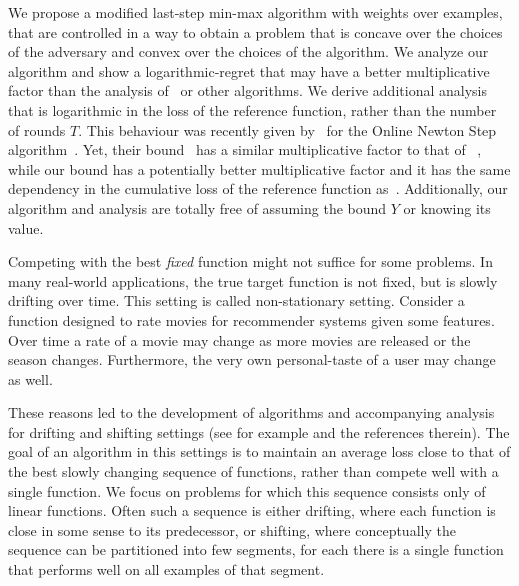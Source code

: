 We propose a modified last-step min-max algorithm with weights over examples, that are controlled in a way to obtain a problem that is concave over the choices of the adversary and convex over the choices of the algorithm. We analyze our algorithm and show a logarithmic-regret that may have a better multiplicative factor than the analysis of~\cite{Forster} or other algorithms. We derive additional analysis that is logarithmic in the loss of the reference function, rather than the number of rounds $T$. This behaviour was recently given by~\cite{OrabonaCBG12} for the Online Newton Step algorithm~\citep{Hazan06logarithmicregret}. Yet, their bound~\citep{OrabonaCBG12} has a similar multiplicative factor to that of
~\cite{Forster}, while our bound has a potentially better multiplicative factor and it has the same dependency in the cumulative loss of the reference function as~\cite{OrabonaCBG12}. Additionally, our algorithm and analysis are totally free of assuming the bound $Y$ or knowing its value.

Competing with the best {\em fixed} function might not suffice for
some problems. In many real-world applications, the true target
function is not fixed, but is slowly drifting over time. This setting is called non-stationary setting. Consider a
function designed to rate movies for recommender systems given some
features. Over time a rate of a movie may change as more movies are
released or the season changes. Furthermore, the very own
personal-taste of a user may change as well.

These reasons led to the development of algorithms and accompanying analysis
for drifting and shifting settings (see for example
\cite{ECCC-TR00-070,HerbsterW01,KivinenSW01,CavallantiCG07} and the references therein).
The goal of an algorithm in this settings is to
maintain an average loss close to that of the best slowly changing
sequence of functions, rather than compete well with a single
function. We focus on problems for which this sequence consists only
of linear functions. Often such a sequence is either drifting, where each
function is close in some sense to its predecessor, or shifting, where
conceptually the sequence can be partitioned into few segments, for each
there is a single function that performs well on all examples of that
segment.

